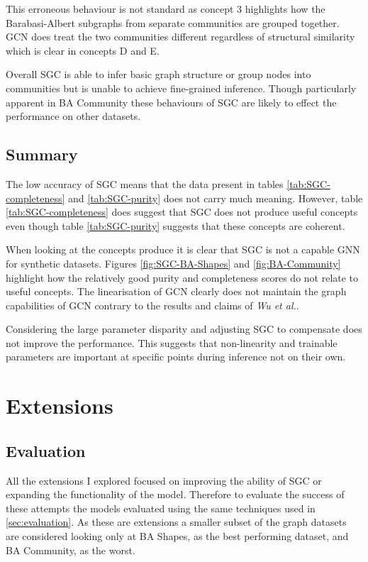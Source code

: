 This erroneous behaviour is not standard as concept 3 highlights how the Barabasi-Albert subgraphs from separate communities are grouped together.
GCN does treat the two communities different regardless of structural similarity which is clear in concepts D and E.

Overall SGC is able to infer basic graph structure or group nodes into communities but is unable to achieve fine-grained inference.
Though particularly apparent in BA Community these behaviours of SGC are likely to effect the performance on other datasets.

\subsection{Summary}
The low accuracy of SGC means that the data present in tables \ref{tab:SGC-completeness} and \ref{tab:SGC-purity} does not carry much meaning.
However, table \ref{tab:SGC-completeness} does suggest that SGC does not produce useful concepts even though table \ref{tab:SGC-purity} suggests that these concepts are coherent.

When looking at the concepts produce it is clear that SGC is not a capable GNN for synthetic datasets.
Figures \ref{fig:SGC-BA-Shapes} and \ref{fig:BA-Community} highlight how the relatively good purity and completeness scores do not relate to useful concepts.
The linearisation of GCN clearly does not maintain the graph capabilities of GCN contrary to the results and claims of \textit{Wu et al.}.

Considering the large parameter disparity and adjusting SGC to compensate does not improve the performance.
This suggests that non-linearity and trainable parameters are important at specific points during inference not on their own.

\section{Extensions}

\subsection{Evaluation}
All the extensions I explored focused on improving the ability of SGC or expanding the functionality of the model.
Therefore to evaluate the success of these attempts the models evaluated using the same techniques used in \ref{sec:evaluation}.
As these are extensions a smaller subset of the graph datasets are considered looking only at BA Shapes, as the best performing dataset, and BA Community, as the worst.

